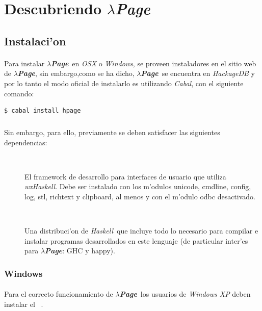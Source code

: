 \documentclass[a4paper]{article}
\newcommand{\haskell}{\textsl{Haskell}}
\newcommand{\hpage}{\textbf{\textsl{$\lambda$Page}}}
\newcommand{\cabal}{\textsl{Cabal}}
\begin{document}
\section{Descubriendo \hpage}
\subsection{Instalaci'on}
\begin{epigraphs}
\end{epigraphs}
\paragraph{}Para instalar \hpage\ en \textsl{OSX} o \textsl{Windows}, se proveen instaladores en el sitio web de \hpage, sin embargo,como se ha dicho, \hpage\ se encuentra en \textsl{HackageDB} y por lo tanto el modo oficial de instalarlo es utilizando \cabal, con el siguiente comando:
\lstset{language=sh, frame=single, tabsize=2}
\begin{center}\begin{lstlisting}
$ cabal install hpage
\end{lstlisting}\end{center}
\subparagraph{}Sin embargo, para ello, previamente se deben satisfacer las siguientes dependencias:
\begin{description}
	\item[~\cite{wxwidgets}] El framework de desarrollo para interfaces de usuario que utiliza \textsl{wxHaskell}.  Debe ser instalado con los m'odulos unicode, cmdline, config, log, stl, richtext y clipboard, al menos y con el m'odulo odbc desactivado.
	\item[~\cite{platform}] Una distribuci'on de \haskell\ que incluye todo lo necesario para compilar e instalar programas desarrollados en este lenguaje (de particular inter'es para \hpage: GHC y happy).
\end{description}
\subsubsection{Windows}
\paragraph{}Para el correcto funcionamiento de \hpage\ los usuarios de \textsl{Windows XP} deben instalar el ~\cite{cppsp1}.
\end{document}

